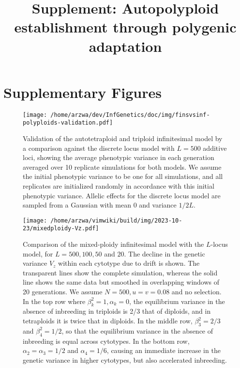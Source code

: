 \documentclass[11pt,a4paper]{article}
\begin{document}
\title{Supplement: Autopolyploid establishment through polygenic adaptation}
\author{}
\date{\vspace{-5ex}}
\maketitle
\tableofcontents
\clearpage

\section{Supplementary Figures}

\begin{figure}[H]
\centering
\texttt{[image: /home/arzwa/dev/InfGenetics/doc/img/finsvsinf-polyploids-validation.pdf]}
\caption{
Validation of the autotetraploid and triploid infinitesimal model by a
comparison against the discrete locus model with $L=500$ additive loci, showing
the average phenotypic variance in each generation averaged over 10 replicate
simulations for both models.
We assume the initial phenotypic variance to be one for all simulations, and
all replicates are initialized randomly in accordance with this initial
phenotypic variance.
Allelic effects for the discrete locus model are sampled from a Gaussian with
mean $0$ and variance $1/2L$.
\label{fig:fininf}}
\end{figure}

\begin{figure}[H]
\centering
\texttt{[image: /home/arzwa/vimwiki/build/img/2023-10-23/mixedploidy-Vz.pdf]}
\caption{Comparison of the mixed-ploidy infinitesimal model with the
\(L\)-locus model, for \(L=500,100,50\) and \(20\). The decline in the
genetic variance \(V_z\) within each cytotype due to drift is shown. The
transparent lines show the complete simulation, whereas the solid line
shows the same data but smoothed in overlapping windows of 20
generations. We assume \(N=500, u=v=0.08\) and no selection. In the top
row where \(\beta_k^2=1, \alpha_k=0\), the equilibrium variance in the
absence of inbreeding in triploids is 2/3 that of diploids, and in
tetraploids it is twice that in diploids. In the middle row,
\(\beta_3^2=2/3\) and \(\beta_4^2=1/2\), so that the equilibrium
variance in the absence of inbreeding is equal across cytotypes. In the
bottom row, \(\alpha_2= \alpha_3 =1/2\) and \(\alpha_4=1/6\), causing an
immediate increase in the genetic variance in higher cytotypes, but also
accelerated inbreeding. \label{fig:vz}}
\end{figure}
\end{document}
